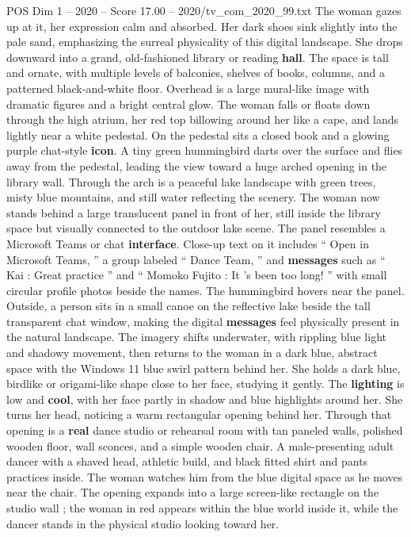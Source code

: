 \begin{textsample}{POS Dim 1 – 2020 – Score 17.00 – 2020/tv\_com\_2020\_99.txt}
The woman gazes up at it, her expression calm and absorbed.
Her dark shoes sink slightly into the pale sand, emphasizing the surreal physicality of this digital landscape.
She drops downward into a grand, old-fashioned library or reading \textbf{hall}.
The space is tall and ornate, with multiple levels of balconies, shelves of books, columns, and a patterned black-and-white floor.
Overhead is a large mural-like image with dramatic figures and a bright central glow.
The woman falls or floats down through the high atrium, her red top billowing around her like a cape, and lands lightly near a white pedestal.
On the pedestal sits a closed book and a glowing purple chat-style \textbf{icon}.
A tiny green hummingbird darts over the surface and flies away from the pedestal, leading the view toward a huge arched opening in the library wall.
Through the arch is a peaceful lake landscape with green trees, misty blue mountains, and still water reflecting the scenery.
The woman now stands behind a large translucent panel in front of her, still inside the library space but visually connected to the outdoor lake scene.
The panel resembles a Microsoft Teams or chat \textbf{interface}.
Close-up text on it includes “ Open in Microsoft Teams, ” a group labeled “ Dance Team, ” and \textbf{messages} such as “ Kai : Great practice ” and “ Momoko Fujito : It ’s been too long! ” with small circular profile photos beside the names.
The hummingbird hovers near the panel.
Outside, a person sits in a small canoe on the reflective lake beside the tall transparent chat window, making the digital \textbf{messages} feel physically present in the natural landscape.
The imagery shifts underwater, with rippling blue light and shadowy movement, then returns to the woman in a dark blue, abstract space with the Windows 11 blue swirl pattern behind her.
She holds a dark blue, birdlike or origami-like shape close to her face, studying it gently.
The \textbf{lighting} is low and \textbf{cool}, with her face partly in shadow and blue highlights around her.
She turns her head, noticing a warm rectangular opening behind her.
Through that opening is a \textbf{real} dance studio or rehearsal room with tan paneled walls, polished wooden floor, wall sconces, and a simple wooden chair.
A male-presenting adult dancer with a shaved head, athletic build, and black fitted shirt and pants practices inside.
The woman watches him from the blue digital space as he moves near the chair.
The opening expands into a large screen-like rectangle on the studio wall ; the woman in red appears within the blue world inside it, while the dancer stands in the physical studio looking toward her.

\end{textsample}
